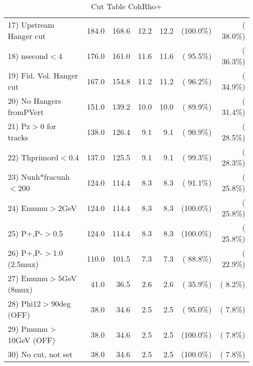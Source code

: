 \begin{table}[h!]
\begin{tabular}{||l||r|r|r|r|r|r||}
 17) Upstream Hanger cut  &        184.0 &        168.6 &         12.2 &         12.2 & (100.0\%) & ( 38.0\%) \\
 18) nsecond$<$4          &        176.0 &        161.0 &         11.6 &         11.6 & ( 95.5\%) & ( 36.3\%) \\
 19) Fid. Vol. Hanger cut &        167.0 &        154.8 &         11.2 &         11.2 & ( 96.2\%) & ( 34.9\%) \\
 20) No Hangers fromPVert &        151.0 &        139.2 &         10.0 &         10.0 & ( 89.9\%) & ( 31.4\%) \\
 21) Pz$>$0 for tracks    &        138.0 &        126.4 &          9.1 &          9.1 & ( 90.9\%) & ( 28.5\%) \\
 22) Thprimord$<$0.4      &        137.0 &        125.5 &          9.1 &          9.1 & ( 99.3\%) & ( 28.3\%) \\
 23) Nunh*fracunh$<$200   &        124.0 &        114.4 &          8.3 &          8.3 & ( 91.1\%) & ( 25.8\%) \\
 24) Emumu$>$2GeV         &        124.0 &        114.4 &          8.3 &          8.3 & (100.0\%) & ( 25.8\%) \\
 25) P+,P-$>$0.5          &        124.0 &        114.4 &          8.3 &          8.3 & (100.0\%) & ( 25.8\%) \\
 26) P+,P-$>$1.0 (2.5mux) &        110.0 &        101.5 &          7.3 &          7.3 & ( 88.8\%) & ( 22.9\%) \\
 27) Emumu$>$5GeV  (8mux) &         41.0 &         36.5 &          2.6 &          2.6 & ( 35.9\%) & (  8.2\%) \\
 28) Phi12$>$90deg  (OFF) &         38.0 &         34.6 &          2.5 &          2.5 & ( 95.0\%) & (  7.8\%) \\
 29) Pmumu$>$10GeV  (OFF) &         38.0 &         34.6 &          2.5 &          2.5 & (100.0\%) & (  7.8\%) \\
 30) No cut, not set      &         38.0 &         34.6 &          2.5 &          2.5 & (100.0\%) & (  7.8\%) \\
 \hline
 \hline
 \end{tabular}
 \caption{Cut Table  CohRho+  }
 \label{tab-cutcohjpsi-mumu_anumunc}
 \end{table}
